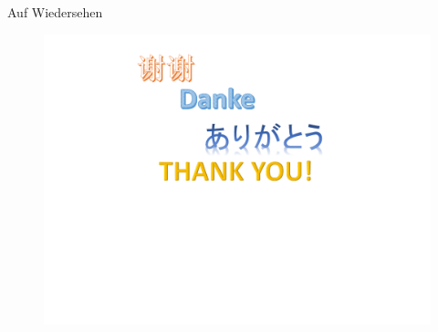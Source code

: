 \documentclass[xcolor=dvipsnames]{beamer}
\begin{document}
\begin{frame}{\large{Auf Wiedersehen}}
\begin{figure}
\centering
\includegraphics[scale=0.5]{thankyou.pdf}
\end{figure}
\end{frame}
\end{document}
